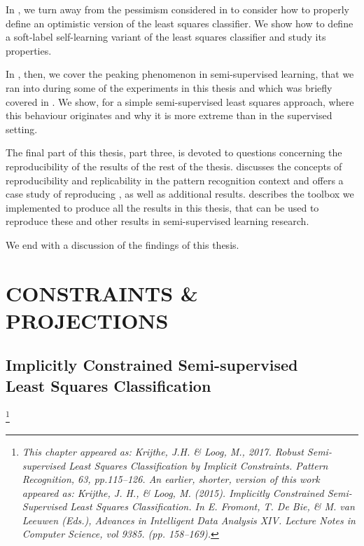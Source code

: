 \documentclass[twoside]{memoir}\usepackage[]{graphicx}\usepackage{xcolor}
\newcommand\blfootnote[1]{%
  \begingroup
  \renewcommand\thefootnote{}\footnote{\itshape#1}%
  \addtocounter{footnote}{-1}%
  \endgroup
}
\newcommand{\mypartpic}{cover/part2.pdf}
\newcommand\PartPic{
\checkoddpage
\ifoddpage
\put(\LenToUnit{-1mm},\LenToUnit{0mm}){
\texttt{[image: \\mypartpic]}
}
\fi
}
\begin{document}
In , we turn away from the pessimism considered in  to consider how to properly define an optimistic version of the least squares classifier. We show how to define a soft-label self-learning variant of the least squares classifier and study its properties.

In , then, we cover the peaking phenomenon in semi-supervised learning, that we ran into during some of the experiments in this thesis and which was briefly covered in . We show, for a simple semi-supervised least squares approach, where this behaviour originates and why it is more extreme than in the supervised setting.

The final part of this thesis, part three, is devoted to questions concerning the reproducibility of the results of the rest of the thesis.  discusses the concepts of reproducibility and replicability in the pattern recognition context and offers a case study of reproducing , as well as additional results.  describes the toolbox we implemented to produce all the results in this thesis, that can be used to reproduce these and other results in semi-supervised learning research.

We end with a discussion of the findings of this thesis.
\mainmatter*
\nopagebreak
\renewcommand{\printpartname}{}
\renewcommand{\printpartnum}{}
\renewcommand{\printparttitle}{\phantom}

\afterpage{\restorepagecolor}
\renewcommand{\mypartpic}{cover/part1.pdf}
\AddToShipoutPicture{\PartPic}
\part{CONSTRAINTS \& PROJECTIONS}
\afterpage{\restorepagecolor}
\ClearShipoutPicture


\chapter[Implicitly Constrained Semi-supervised Least Squares Classification]{Implicitly Constrained Semi-supervised\\Least Squares Classification}
\label{chapter:icls}
\blfootnote{This chapter appeared as: Krijthe, J.H. \& Loog, M., 2017. Robust Semi-supervised Least Squares Classification by Implicit Constraints. Pattern Recognition, 63, pp.115–126. An earlier, shorter, version of this work appeared as: Krijthe, J. H., \& Loog, M. (2015). Implicitly Constrained Semi-Supervised Least Squares Classification. In E. Fromont, T. De Bie, \& M. van Leeuwen (Eds.), Advances in Intelligent Data Analysis XIV. Lecture Notes in Computer Science, vol 9385. (pp. 158–169).}
\end{document}
